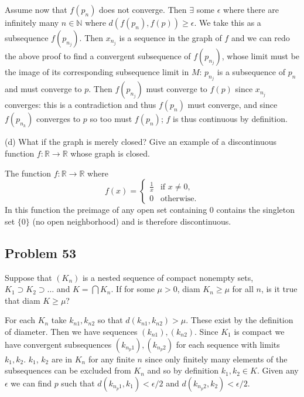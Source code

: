 \documentclass{amsart}
\begin{document}
\medskip

\noindent Assume now that $f(p_n)$ does not converge. Then $\exists$ some $\epsilon$ where there are infinitely many $n\in\mathbb{N}$
where $d(f(p_n), f(p))\geq\epsilon$. We take this as a subsequence $f(p_{n_j})$. Then $x_{n_j}$ is a sequence in the graph of $f$ and we can redo the 
above proof to find a convergent subsequence of $f(p_{n_j})$, whose limit must be the image of its corresponding subsequence limit in $M$: $p_{n_j}$ is
a subsequence of $p_n$ and must converge to $p$. Then $f(p_{n_j})$ must converge to $f(p)$ since $x_{n_j}$ converges: this is a contradiction and thus
$f(p_n)$ must converge, and since $f(p_{n_k})$ converges to $p$ so too must $f(p_n)$; $f$ is thus continuous by definition.

\medskip

(d) What if the graph is merely closed? Give an example of a discontinuous function $f:\mathbb{R}\rightarrow\mathbb{R}$ whose graph is closed.

\medskip

\noindent The function $f: \mathbb{R}\rightarrow\mathbb{R}$ where $$f(x) = \begin{cases}
    \frac{1}{x} & \text{if } x \neq 0,\\
    0  & \text{otherwise}.
    \end{cases}$$
In this function the preimage of any open set containing $0$ contains the singleton set $\{0\}$ (no open neighborhood) and is therefore discontinuous.


\newpage
\subsection*{Problem 53} Suppose that $(K_n)$ is a nested sequence of compact nonempty sets, $K_1\supset K_2\supset\dots$ and $K=\bigcap K_n$. 
If for some $\mu>0$, diam $K_n\geq \mu$ for all $n$, is it true that diam $K\geq\mu$?

\medskip

\noindent For each $K_n$ take $k_{n1}, k_{n2}$ so that $d(k_{n1}, k_{n2})>\mu$. These exist by the definition of diameter. Then we have sequences
$(k_{n1}), (k_{n2})$. Since $K_1$ is compact we have convergent subsequences $(k_{n_p1}), (k_{n_p2})$ for each sequence with limits $k_1, k_2$. $k_1$, $k_2$
are in $K_n$ for any finite $n$ since only finitely many elements of the subsequences can be excluded from $K_n$ and so by definition $k_1, k_2\in K$. 
Given any $\epsilon$ we can find $p$ such that $d(k_{n_p1}, k_1) <\epsilon/2$ and $d(k_{n_p2}, k_2)<\epsilon/2$.
\end{document}
